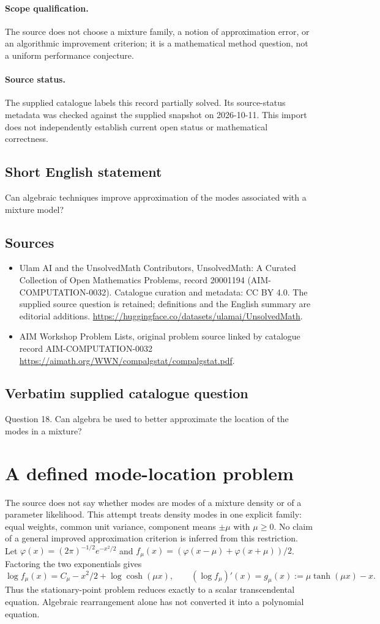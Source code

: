 \documentclass[11pt]{article}
\begin{document}
\paragraph{Scope qualification.}
The source does not choose a mixture family, a notion of approximation error, or an algorithmic improvement criterion; it is a mathematical method question, not a uniform performance conjecture.
\paragraph{Source status.}
The supplied catalogue labels this record partially solved. Its source-status metadata was checked against the supplied snapshot on 2026-10-11. This import does not independently establish current open status or mathematical correctness.
\subsection{Short English statement}
Can algebraic techniques improve approximation of the modes associated with a mixture model?
\subsection{Sources}
\begin{itemize}
\item[S1] Ulam AI and the UnsolvedMath Contributors, UnsolvedMath: A Curated Collection of Open Mathematics Problems, record 20001194 (AIM-COMPUTATION-0032). Catalogue curation and metadata: CC BY 4.0. The supplied source question is retained; definitions and the English summary are editorial additions.
\url{https://huggingface.co/datasets/ulamai/UnsolvedMath}.
\item[S2] AIM Workshop Problem Lists, original problem source linked by catalogue record AIM-COMPUTATION-0032
\url{https://aimath.org/WWN/compalgstat/compalgstat.pdf}.
\end{itemize}
\subsection{Verbatim supplied catalogue question}
Question 18. Can algebra be used to better approximate the location of the modes in a mixture?

\section{A defined mode-location problem}
The source does not say whether modes are modes of a mixture density or
of a parameter likelihood. This attempt treats density modes in one
explicit family: equal weights, common unit variance, component means
$\pm\mu$ with $\mu\ge0$. No claim of a general improved approximation
criterion is inferred from this restriction.
Let $\varphi(x)=(2\pi)^{-1/2}e^{-x^2/2}$ and
$f_\mu(x)=(\varphi(x-\mu)+\varphi(x+\mu))/2$.
Factoring the two exponentials gives
\[
 \log f_\mu(x)=C_\mu-x^2/2+\log\cosh(\mu x),\qquad
 (\log f_\mu)'(x)=g_\mu(x):=\mu\tanh(\mu x)-x.
\]
Thus the stationary-point problem reduces exactly to a scalar
transcendental equation. Algebraic rearrangement alone has not converted
it into a polynomial equation.
\end{document}
